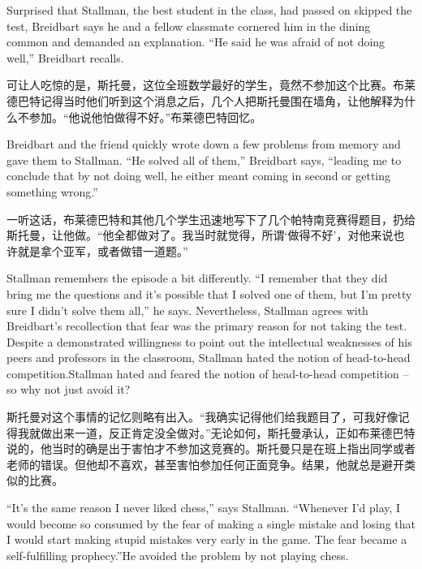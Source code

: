 \ifdefined\eng
Surprised that Stallman, the best student in the class, had \ifdefined\vone passed on \fi\ifdefined\vtwo skipped \fi the test, Breidbart says he and a fellow classmate cornered him in the dining common and demanded an explanation. ``He said he was afraid of not doing well,'' Breidbart recalls.
\fi

\ifdefined\chs
可让人吃惊的是，斯托曼，这位全班数学最好的学生，竟然不参加这个比赛。布莱德巴特记得当时他们听到这个消息之后，几个人把斯托曼围在墙角，让他解释为什么不参加。``他说他怕做得不好。''布莱德巴特回忆。
\fi

\ifdefined\eng
Breidbart and the friend quickly wrote down a few problems from memory and gave them to Stallman. ``He solved all of them,'' Breidbart says, ``leading me to conclude that by not doing well, he either meant coming in second or getting something wrong.''
\fi

\ifdefined\chs
一听这话，布莱德巴特和其他几个学生迅速地写下了几个帕特南竞赛得题目，扔给斯托曼，让他做。``他全都做对了。我当时就觉得，所谓`做得不好'，对他来说也许就是拿个亚军，或者做错一道题。''
\fi

\ifdefined\eng
Stallman remembers the episode a bit differently. ``I remember that they did bring me the questions and it's possible that I solved one of them, but I'm pretty sure I didn't solve them all,'' he says. Nevertheless, Stallman agrees with Breidbart's recollection that fear was the primary reason for not taking the test. Despite a demonstrated willingness to point out the intellectual weaknesses of his peers and professors in the classroom, \ifdefined\vone Stallman hated the notion of head-to-head competition.\fi\ifdefined\vtwo Stallman hated and feared the notion of head-to-head competition -- so why not just avoid it?\fi
\fi

\ifdefined\chs
斯托曼对这个事情的记忆则略有出入。``我确实记得他们给我题目了，可我好像记得我就做出来一道，反正肯定没全做对。''无论如何，斯托曼承认，正如布莱德巴特说的，他当时的确是出于害怕才不参加这竞赛的。斯托曼只是在班上指出同学或者老师的错误。但他却不喜欢，甚至害怕参加任何正面竞争。结果，他就总是避开类似的比赛。
\fi

\ifdefined\eng
``It's the same reason I never liked chess,'' says Stallman. ``Whenever I'd play, I would become so consumed by the fear of making a single mistake \ifdefined\vtwo and losing \fi that I would start making stupid mistakes very early in the game. The fear became a self-fulfilling prophecy.''\ifdefined\vtwo  He avoided the problem by not playing chess.\fi
\fi

